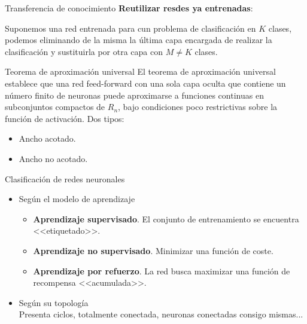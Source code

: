 \documentclass[spanish]{beamer}
\begin{document}
\begin{frame}{Transferencia de conocimiento}
\textbf{Reutilizar resdes ya entrenadas}:

Suponemos una red entrenada para cun problema de clasificación en $K$ clases, podemos eliminando de la misma la última capa encargada de realizar la clasificación y sustituirla por otra capa con $M \neq K$ clases. 
\end{frame}

\begin{frame}{Teorema de aproximación universal}
El teorema de aproximación universal establece que una red feed-forward con una sola capa oculta que contiene un número finito de neuronas puede aproximarse a funciones continuas en subconjuntos compactos de $R_n$, bajo condiciones poco restrictivas sobre la función de activación.
Dos tipos:
\begin{itemize}
  \item Ancho acotado.
  \item Ancho no acotado.
\end{itemize}
\end{frame}

\begin{frame}{Clasificación de redes neuronales}
  \begin{itemize}
    \item Según el modelo de aprendizaje
      \begin{itemize}
      \item \textbf{Aprendizaje supervisado}. El conjunto de entrenamiento se
        encuentra <<etiquetado>>.
      \item \textbf{Aprendizaje no supervisado}. Minimizar una función de coste.
      \item \textbf{Aprendizaje por refuerzo}. La red busca maximizar una función de
        recompensa <<acumulada>>.
      \end{itemize}
    \item Según su topología\\
      Presenta ciclos, totalmente conectada, neuronas conectadas consigo mismas...
  \end{itemize}
\end{frame}
\end{document}
